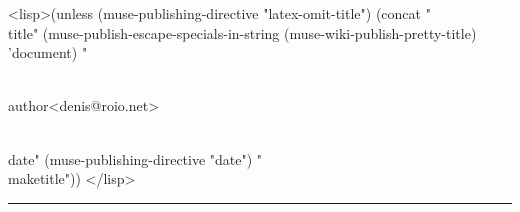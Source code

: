 \documentclass[final,a4paper,12pt,onecolumn,twoside]{memoir}
\begin{document}
<lisp>(unless (muse-publishing-directive "latex-omit-title")
(concat "\\title{" (muse-publish-escape-specials-in-string
  (muse-wiki-publish-pretty-title) 'document) "}

\\author{<denis@roio.net>}

\\date{" (muse-publishing-directive "date") "}
\\maketitle"))
</lisp>

\vspace{.5cm}\hrule\vspace{.5cm}
\end{document}
